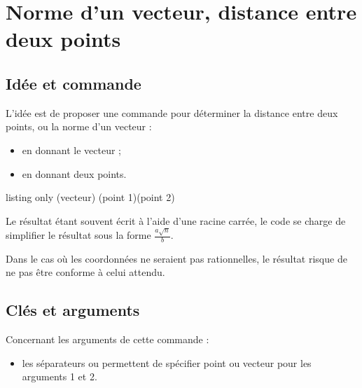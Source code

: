 \documentclass[a4paper,french,11pt]{article}
\newcommand\ctex[1]{\tcbox[vignettelatex]{#1}}
\newcommand\cmaj[1]{%
	{\tcbox[vignetteMaJ]{#1}\xspace}%
}
\begin{document}
\newpage

\section{Norme d'un vecteur, distance entre deux points}\label{normevect}

\subsection{Idée et commande}

\begin{tipblock}
\cmaj{2.6.5} L'idée est de proposer une commande pour déterminer la distance entre deux points, ou la norme d'un vecteur :

\begin{itemize}
	\item en donnant le vecteur ;
	\item en donnant deux points.
\end{itemize}
\vspace*{-\baselineskip}\leavevmode
\end{tipblock}

\begin{PresCodeTexPL}{listing only}
\TrouveNorme(vecteur)
\TrouveNorme(point 1)(point 2)
\end{PresCodeTexPL}

\begin{noteblock}
Le résultat étant souvent écrit à l'aide d'une racine carrée, le code se charge de simplifier le résultat sous la forme $\frac{a\sqrt{n}}{b}$.

Dans le cas où les coordonnées ne seraient pas rationnelles, le résultat risque de ne pas être conforme à celui attendu.
\end{noteblock}

\subsection{Clés et arguments}

\begin{cautionblock}
Concernant les arguments de cette commande :

\begin{itemize}
	\item les séparateurs \ctex{,} ou \ctex{;} permettent de spécifier point ou vecteur pour les arguments 1 et 2.
\end{itemize}
\vspace*{-\baselineskip}\leavevmode
\end{cautionblock}
\end{document}
